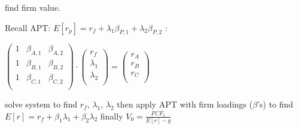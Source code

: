 find firm value.

Recall APT: $E[r_p] = r_f + \lambda_1 \beta_{P,1} + \lambda_2 \beta_{P,2}$ :


$
\begin{pmatrix}
	1 & \beta_{A,1} &  \beta_{A,2} \\
	1 & \beta_{B,1} &  \beta_{B,2} \\
	1 & \beta_{C,1} &  \beta_{C,2} \\							
\end{pmatrix} \cdot 
\begin{pmatrix}
	r_f \\
	\lambda_1 \\
	\lambda_2 \\								
\end{pmatrix}	
=
\begin{pmatrix}
	r_A \\
	r_B \\
	r_C \\								
\end{pmatrix}
$
 
solve system to find $r_f$, $\lambda_1$, $\lambda_2$ then apply APT with firm loadings ($\beta$'s) to find $E[r]=r_f+\beta_1 \lambda_1 + \beta_2 \lambda_2 $ finally $V_0 = \frac{FCF_1}{E[r]-g}$